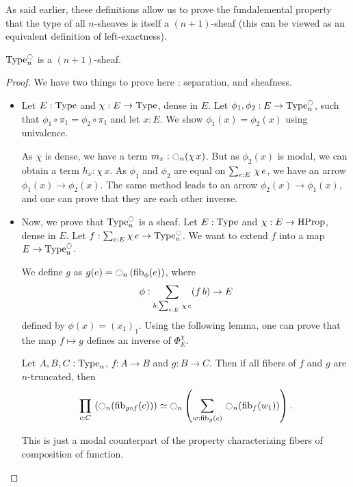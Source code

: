 As said earlier, these definitions allow us to prove the fundalemental
property that the type of all $n$-sheaves is itself a $(n+1)$-sheaf
(this can be viewed as an equivalent definition of left-exactness).

\begin{prop}
\label{prop:sheaf-is-sheaf}
  $\operatorname{Type}_n^{\ocircle}$ is a $(n+1)$-sheaf.
\end{prop}

\begin{proof}
  We have two things to prove here : separation, and sheafness.
  \begin{itemize}
  \item Let $E:\operatorname{Type}$ and $\chi:E\to\operatorname{Type}$, dense in $E$. 
    Let $\phi_1,\phi_2:E \to
    \operatorname{Type}_n^{\ocircle}$, such that $\phi_1 \circ \pi_1 = \phi_2 \circ
    \pi_1$ and let $x:E$. We show $\phi_1(x) = \phi_2(x)$ using
    univalence.
    
    As $\chi$ is dense, we have a term $m_x : \ocircle_n(\chi\, x)$.
    But as $\phi_2(x)$ is modal, we can obtain a term $h_x : \chi\,
    x$. 
    As $\phi_1$ and $\phi_2$ are equal on $\sum_{e:E}\, \chi\, e$, we
    have an arrow $\phi_1(x) \to \phi_2(x)$.
    The same method leads to an arrow $\phi_2 (x) \to \phi_1 (x)$, and
    one can
    prove that they are each other inverse.
  \item Now, we prove that $\operatorname{Type}_n^{\ocircle}$ is a sheaf. Let $E:\operatorname{Type}$ and
  $\chi:E \to \operatorname{HProp}$, dense in $E$. Let $f:\sum_{e:E} \chi\, e \to
  \operatorname{Type}_n^{\ocircle}$. We want to extend $f$ into a map $E \to \operatorname{Type}_n^{\ocircle}$.

  We define $g$ as $g(e) = \ocircle_n \left( \mathrm{fib}_{\phi}(e) \right)$,
  where
  \[ \phi : \sum_{b:\sum_{e:E}\, \chi\, e} (f\,
    b) \to E\]
  defined by $\phi(x) = (x_1)_1$.
  Using the following lemma, one can prove that the map $f\mapsto g$
  defines an inverse of $\Phi_E^\chi$.
  \begin{lem}
    Let $A,B,C:\operatorname{Type}_n$, $f:A\to B$ and $g:B\to C$.
    Then
    if all fibers of $f$ and $g$ are $n$-truncated, then
      \[\prod_{c:C}\, \left( \ocircle_n(\mathrm{fib}_{g \circ f}(c)) \right) \simeq
      \ocircle_n \left(  
        \sum_{w:\mathrm{fib}_{g}(c)}\, \ocircle_n (\mathrm{fib}_{f}(w_1))
      \right).\]
  \end{lem}
  \begin{prooflem}
    This is just a modal counterpart of the property characterizing
    fibers of composition of function.
  \end{prooflem}
  \end{itemize}
\end{proof}

